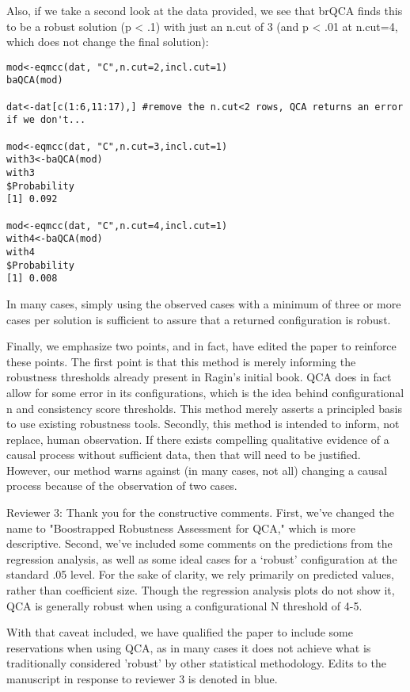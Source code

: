 \documentclass[10pt,stdletter,dateno,sigleft]{newlfm} %
\begin{document}
\begin{newlfm}
Also, if we take a second look at the data provided, we see that brQCA finds this to be a robust solution (p < .1) with just an n.cut of 3 (and p < .01 at n.cut=4, which does not change the final solution):

\begin{verbatim}
mod<-eqmcc(dat, "C",n.cut=2,incl.cut=1)
baQCA(mod)

dat<-dat[c(1:6,11:17),] #remove the n.cut<2 rows, QCA returns an error if we don't...

mod<-eqmcc(dat, "C",n.cut=3,incl.cut=1)
with3<-baQCA(mod)
with3
$Probability
[1] 0.092

mod<-eqmcc(dat, "C",n.cut=4,incl.cut=1)
with4<-baQCA(mod)
with4
$Probability
[1] 0.008

\end{verbatim} 

In many cases, simply using the observed cases with a minimum of three or more cases per solution is sufficient to assure that a returned configuration is robust. 

Finally, we emphasize two points, and in fact, have edited the paper to reinforce these points. The first point is that this method is merely informing the robustness thresholds already present in Ragin's initial book. QCA does in fact allow for some error in its configurations, which is the idea behind configurational n and consistency score thresholds. This method merely asserts a principled basis to use existing robustness tools.  Secondly, this method is intended to inform, not replace, human observation. If there exists compelling qualitative evidence of a causal process without sufficient data, then that will need to be justified. However, our method warns against (in many cases, not all) changing a causal process because of the observation of two cases.


Reviewer 3: Thank you for the constructive comments. First, we've changed the name to "Boostrapped Robustness Assessment for QCA," which is more descriptive. Second, we've included some comments on the predictions from the regression analysis, as well as some ideal cases for a `robust' configuration at the standard .05 level. For the sake of clarity, we rely primarily on predicted values, rather than coefficient size. Though the regression analysis plots do not show it, QCA is generally robust when using a configurational N threshold of 4-5. 

With that caveat included, we have qualified the paper to include some reservations when using QCA, as in many cases it does not achieve what is traditionally considered 'robust' by other statistical methodology. Edits to the manuscript in response to reviewer 3 is denoted in blue. \newline


\end{newlfm}
\end{document}
